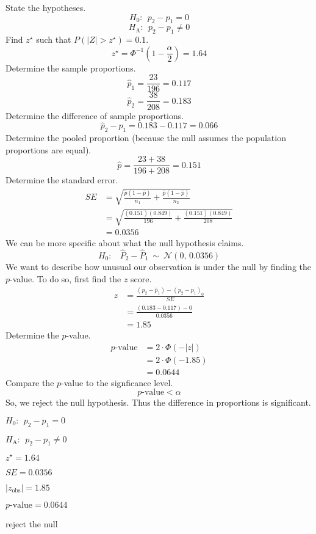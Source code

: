 \begin{solution}
State the hypotheses. \[H_0:~~ p_2-p_1 = 0 \]
\[H_\text{A}: ~~ p_2-p_1 \ne 0 \] Find \(z^\star\) such that
\(P(|Z|>z^\star) = 0.1\).
\[z^\star = \Phi^{-1}\left(1-\frac{\alpha}{2}\right) = 1.64 \] Determine
the sample proportions. \[\hat{p}_1 = \frac{23}{196} = 0.117 \]
\[\hat{p}_2 = \frac{38}{208} = 0.183 \] Determine the difference of
sample proportions. \[\hat{p}_2-\hat{p}_1 = 0.183-0.117 = 0.066 \]
Determine the pooled proportion (because the null assumes the population
proportions are equal). \[ \hat{p} = \frac{23+38}{196+208} = 0.151 \]
Determine the standard error. \[
\begin{aligned}
SE &= \sqrt{\frac{\hat{p}(1-\hat{p})}{n_1}+\frac{\hat{p}(1-\hat{p})}{n_2}} \\[1em]
&= \sqrt{\frac{(0.151)(0.849)}{196}+\frac{(0.151)(0.849)}{208}} \\[1em]
&= 0.0356
\end{aligned}
\] We can be more specific about what the null hypothesis claims.
\[H_0:~~~~ \hat{P}_2-\hat{P}_1 ~\sim~ \mathcal{N}(0,\,0.0356)\] We want
to describe how unusual our observation is under the null by finding the
\(p\)-value. To do so, first find the \(z\) score. \[
\begin{aligned}
z &= \frac{(\hat{p}_2-\hat{p}_1)-(p_2-p_1)_0}{SE}\\
&= \frac{(0.183-0.117)-0}{0.0356} \\
&= 1.85
\end{aligned}
\] Determine the \(p\)-value. \[
\begin{aligned}
p\text{-value} &= 2\cdot \Phi(-|z|)\\
&= 2\cdot \Phi(-1.85)\\
&= 0.0644
\end{aligned}
\] Compare the \(p\)-value to the signficance level.
\[ p\text{-value} < \alpha \] So, we reject the null hypothesis. Thus
the difference in proportions is significant.
\begin{answerlist}
  \item \(H_0: ~~p_2-p_1=0\)
  \item \(H_\text{A}:~~ p_2-p_1\ne 0\)
  \item \(z^\star = 1.64\)
  \item \(SE = 0.0356\)
  \item \(|z_\text{obs}| = 1.85\)
  \item \(p\text{-value} = 0.0644\)
  \item reject the null
\end{answerlist}
\end{solution}

